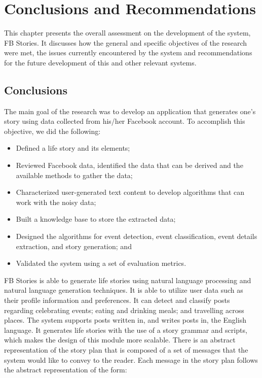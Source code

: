 \chapter{Conclusions and Recommendations}
\label{sec:conclusionsandrecommendations} 
This chapter presents the overall assessment on the development of the system, FB Stories. It discusses how the general and specific objectives of the research were met, the issues currently encountered by the system and recommendations for the future development of this and other relevant systems.

\section{Conclusions}
The main goal of the research was to develop an application that generates one's story using data collected from his/her Facebook account. To accomplish this objective, we did the following: 
\begin{itemize}
	\item Defined a life story and its elements;
	\item Reviewed Facebook data, identified the data that can be derived and the available methods to gather the data;
	\item Characterized user-generated text content to develop algorithms that can work with the noisy data;
	\item Built a knowledge base to store the extracted data;
	\item Designed the algorithms for event detection, event classification, event details extraction, and story generation; and 
	\item Validated the system using a set of evaluation metrics.
\end{itemize}

FB Stories is able to generate life stories using natural language processing and natural language generation techniques. It is able to utilize user data such as their profile information and preferences.  It can detect and classify posts regarding celebrating events; eating and drinking meals; and travelling across places. The system supports posts written in, and writes posts in, the English language. It generates life stories with the use of a story grammar and scripts, which makes the design of this module more scalable. There is an abstract representation of the story plan that is composed of a set of messages that the system would like to convey to the reader. Each message in the story plan follows the abstract representation of the form:

